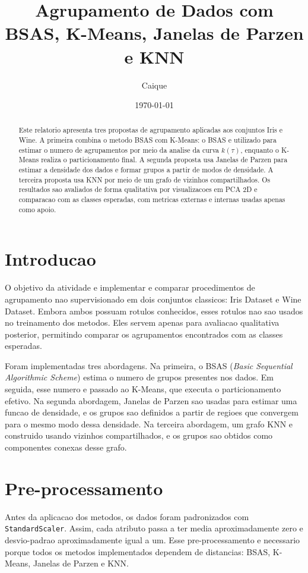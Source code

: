 \documentclass[12pt,a4paper]{article}
\title{Agrupamento de Dados com BSAS, K-Means, Janelas de Parzen e KNN}
\author{Caique}
\date{\today}
\begin{document}
\maketitle

\begin{abstract}
Este relatorio apresenta tres propostas de agrupamento aplicadas aos conjuntos
Iris e Wine. A primeira combina o metodo BSAS com K-Means: o BSAS e utilizado
para estimar o numero de agrupamentos por meio da analise da curva
$k(\tau)$, enquanto o K-Means realiza o particionamento final. A segunda
proposta usa Janelas de Parzen para estimar a densidade dos dados e formar
grupos a partir de modos de densidade. A terceira proposta usa KNN por meio de
um grafo de vizinhos compartilhados. Os resultados sao avaliados de forma
qualitativa por visualizacoes em PCA 2D e comparacao com as classes esperadas,
com metricas externas e internas usadas apenas como apoio.
\end{abstract}

\section{Introducao}

O objetivo da atividade e implementar e comparar procedimentos de agrupamento
nao supervisionado em dois conjuntos classicos: Iris Dataset e Wine Dataset.
Embora ambos possuam rotulos conhecidos, esses rotulos nao sao usados no
treinamento dos metodos. Eles servem apenas para avaliacao qualitativa posterior,
permitindo comparar os agrupamentos encontrados com as classes esperadas.

Foram implementadas tres abordagens. Na primeira, o BSAS
(\textit{Basic Sequential Algorithmic Scheme}) estima o numero de grupos
presentes nos dados. Em seguida, esse numero e passado ao K-Means, que executa o
particionamento efetivo. Na segunda abordagem, Janelas de Parzen sao usadas para
estimar uma funcao de densidade, e os grupos sao definidos a partir de regioes
que convergem para o mesmo modo dessa densidade. Na terceira abordagem, um grafo
KNN e construido usando vizinhos compartilhados, e os grupos sao obtidos como
componentes conexas desse grafo.

\section{Pre-processamento}

Antes da aplicacao dos metodos, os dados foram padronizados com
\texttt{StandardScaler}. Assim, cada atributo passa a ter media aproximadamente
zero e desvio-padrao aproximadamente igual a um. Esse pre-processamento e
necessario porque todos os metodos implementados dependem de distancias:
BSAS, K-Means, Janelas de Parzen e KNN.
\end{document}
